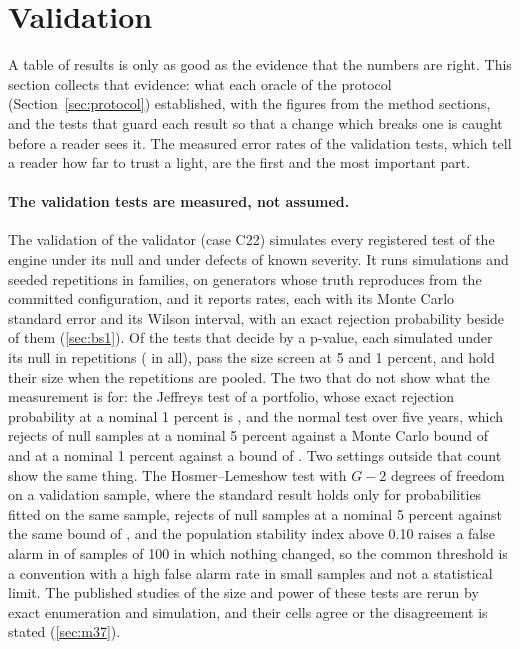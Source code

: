 \section{Validation}
\label{sec:validation}

A table of results is only as good as the evidence that the numbers are right. This section collects that evidence: what each oracle of the protocol (Section~\ref{sec:protocol}) established, with the figures from the method sections, and the tests that guard each result
so that a change which breaks one is caught before a reader sees it. The measured error rates of the validation tests, which tell a reader how far to trust a light, are the first and the most important part.

\paragraph{The validation tests are measured, not assumed.} The validation of the validator (case C22) simulates every registered test of the engine under its null and under defects of known severity. It runs \pxOneSims{} simulations and \pxOneReps{} seeded repetitions in \pxOneFamilies{} families, on \pxOneGens{} generators whose truth reproduces from the committed configuration, and it reports \pxOneRates{} rates, each with its Monte Carlo standard error and its Wilson interval, with an exact rejection probability beside \pxOneExact{} of them (\cref{sec:bs1}). Of the \pxOneTests{} tests that decide by a p-value, each simulated under its null in \rsCTwentyTwoNullPerTest{} repetitions (\rsCTwentyTwoNullReps{} in all), \rsCTwentyTwoWithin{} pass the size screen at 5 and 1 percent, and \pxPpOneHold{} hold their size when the repetitions are pooled. The two that do not show what the measurement is for: the Jeffreys test of a portfolio, whose exact rejection probability at a nominal 1 percent is \rsCTwentyTwoJeffExactOne{}, and the normal test over five years, which rejects \rsCTwentyTwoNormal{} of null samples at a nominal 5 percent against a Monte Carlo bound of \rsCTwentyTwoBound{} and \rsCTwentyTwoNormalOne{} at a nominal 1 percent against a bound of \rsCTwentyTwoBoundOne{}. Two settings outside that count show the same thing. The Hosmer--Lemeshow test with $G-2$ degrees of freedom on a validation sample, where the standard result holds only for probabilities fitted on the same sample, rejects \rsCTwentyTwoHl{} of null samples at a nominal 5 percent against the same bound of \rsCTwentyTwoBound{}, and the population stability index above 0.10 raises a false alarm in \rsCTwentyTwoPsi{} of samples of 100 in which nothing changed, so the common threshold is a convention with a high false alarm rate in small samples and not a statistical limit. The published studies of the size and power of these tests are rerun by exact enumeration and simulation, and their cells agree or the disagreement is stated (\cref{sec:m37}).

